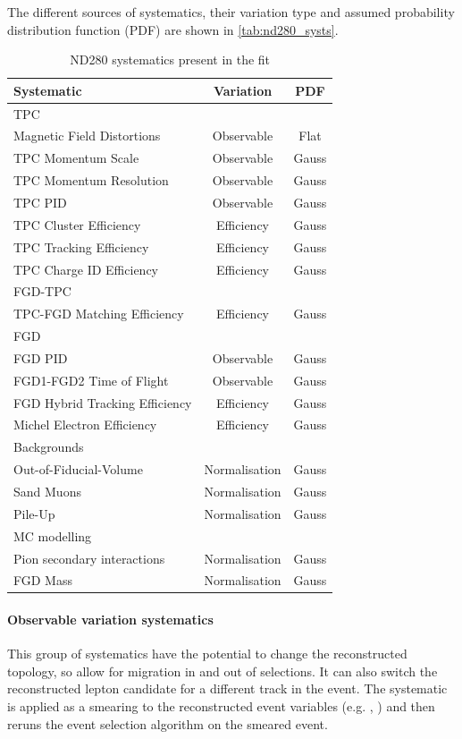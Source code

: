 The different sources of systematics, their variation type and assumed probability distribution function (PDF) are shown in \autoref{tab:nd280_systs}.
\begin{table}[h]
	\begin{tabular}{l | c c}
	\hline
	\hline
	Systematic						& Variation 	& PDF \\
	\hline
	\multicolumn{3}{l}{TPC} \\
	Magnetic Field Distortions		& Observable 	& Flat \\
	TPC Momentum Scale				& Observable	& Gauss \\
	TPC Momentum Resolution			& Observable	& Gauss \\
	TPC PID							& Observable	& Gauss \\
	TPC Cluster Efficiency			& Efficiency	& Gauss \\
	TPC Tracking Efficiency			& Efficiency	& Gauss \\
	TPC Charge ID Efficiency		& Efficiency	& Gauss \\
	\hline 
	\multicolumn{3}{l}{FGD-TPC} \\
	TPC-FGD Matching Efficiency		& Efficiency	& Gauss \\
	\hline
	\multicolumn{3}{l}{FGD} \\
	FGD PID							& Observable	& Gauss \\
	FGD1-FGD2 Time of Flight		& Observable	& Gauss \\
	FGD Hybrid Tracking Efficiency	& Efficiency	& Gauss \\
	Michel Electron Efficiency		& Efficiency	& Gauss \\
	\hline
	\multicolumn{3}{l}{Backgrounds} \\
	Out-of-Fiducial-Volume			& Normalisation & Gauss \\
	Sand Muons						& Normalisation & Gauss \\
	Pile-Up							& Normalisation	& Gauss \\
	\hline
	\multicolumn{3}{l}{MC modelling} \\
	Pion secondary interactions		& Normalisation & Gauss \\
	FGD Mass						& Normalisation & Gauss \\
	\hline
	\hline
	\end{tabular}
\caption{ND280 systematics present in the fit}
\label{tab:nd280_systs}
\end{table}

\paragraph{Observable variation systematics}
This group of systematics have the potential to change the reconstructed topology, so allow for migration in and out of selections. It can also switch the reconstructed lepton candidate for a different track in the event. The systematic is applied as a smearing to the reconstructed event variables (e.g. \pmu, \cosmu) and then reruns the event selection algorithm on the smeared event.

